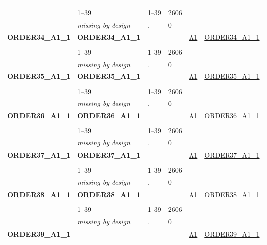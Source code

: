 \begin{longtable}{| L{2.45cm} | L{6cm} | C{1.5cm} | R{1cm} | C{2.25cm} | C{2.25cm} |}
   &  &  &  &  &  \\ 
   & 1--39 & 1--39 & 2606 &  &  \\ 
   & \textit{missing by design} & \textit{.} & 0 &  &  \\ 
   \midrule
\textbf{ORDER34\_A1\_1}\label{var:ORDER34:A1:1} & \textbf{ORDER34\_A1\_1} &  &  & \hyperref[A1]{A1} & \hyperref[var:suf:ORDER34:A1:1]{ORDER34\_A1\_1} \\ 
   &  &  &  &  &  \\ 
   & 1--39 & 1--39 & 2606 &  &  \\ 
   & \textit{missing by design} & \textit{.} & 0 &  &  \\ 
   \midrule
\textbf{ORDER35\_A1\_1}\label{var:ORDER35:A1:1} & \textbf{ORDER35\_A1\_1} &  &  & \hyperref[A1]{A1} & \hyperref[var:suf:ORDER35:A1:1]{ORDER35\_A1\_1} \\ 
   &  &  &  &  &  \\ 
   & 1--39 & 1--39 & 2606 &  &  \\ 
   & \textit{missing by design} & \textit{.} & 0 &  &  \\ 
   \midrule
\textbf{ORDER36\_A1\_1}\label{var:ORDER36:A1:1} & \textbf{ORDER36\_A1\_1} &  &  & \hyperref[A1]{A1} & \hyperref[var:suf:ORDER36:A1:1]{ORDER36\_A1\_1} \\ 
   &  &  &  &  &  \\ 
   & 1--39 & 1--39 & 2606 &  &  \\ 
   & \textit{missing by design} & \textit{.} & 0 &  &  \\ 
   \midrule
\textbf{ORDER37\_A1\_1}\label{var:ORDER37:A1:1} & \textbf{ORDER37\_A1\_1} &  &  & \hyperref[A1]{A1} & \hyperref[var:suf:ORDER37:A1:1]{ORDER37\_A1\_1} \\ 
   &  &  &  &  &  \\ 
   & 1--39 & 1--39 & 2606 &  &  \\ 
   & \textit{missing by design} & \textit{.} & 0 &  &  \\ 
   \midrule
\textbf{ORDER38\_A1\_1}\label{var:ORDER38:A1:1} & \textbf{ORDER38\_A1\_1} &  &  & \hyperref[A1]{A1} & \hyperref[var:suf:ORDER38:A1:1]{ORDER38\_A1\_1} \\ 
   &  &  &  &  &  \\ 
   & 1--39 & 1--39 & 2606 &  &  \\ 
   & \textit{missing by design} & \textit{.} & 0 &  &  \\ 
   \midrule
\textbf{ORDER39\_A1\_1}\label{var:ORDER39:A1:1} & \textbf{} &  &  & \hyperref[A1]{A1} & \hyperref[var:suf:ORDER39:A1:1]{ORDER39\_A1\_1} \\ 

\end{longtable}
